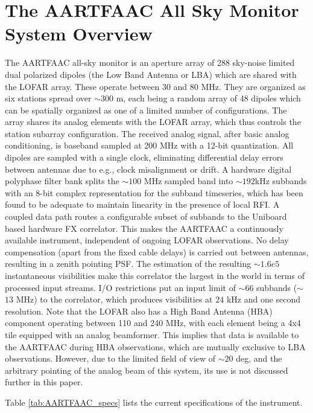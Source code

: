 \documentclass{aa}
\begin{document}
\section{\label{sec:The-AARTFAAC-All}The AARTFAAC All Sky Monitor System
Overview} The  AARTFAAC all-sky  monitor is an  aperture array of  288 sky-noise
limited dual  polarized dipoles (the Low  Band Antenna or LBA)  which are shared
with the LOFAR  array. These operate between 30 and 80  MHz.  They are organized
as  six stations spread  over $\sim$$300$  m, each  being a  random array  of 48
dipoles  which  can  be spatially  organized  as  one  of  a limited  number  of
configurations. The array shares its analog elements with the LOFAR array, which
thus controls  the station subarray  configuration. The received  analog signal,
after basic  analog conditioning, is baseband  sampled at 200 MHz  with a 12-bit
quantization.   All  dipoles  are  sampled  with  a  single  clock,  eliminating
differential delay  errors between antennas  due to e.g., clock  misalignment or
drift.   A hardware  digital polyphase  filter bank  splits the  $\sim$$100$ MHz
sampled band  into $\sim$$192$kHz subbands with an  8-bit complex representation
for the  subband timeseries,  which has  been found to  be adequate  to maintain
linearity  in  the  presence  of  local  RFI.  A  coupled  data  path  routes  a
configurable   subset  of   subbands   to  the   Uniboard   based  hardware   FX
correlator.  This  makes  the  AARTFAAC  a  continuously  available  instrument,
independent of ongoing LOFAR observations. No delay compensation (apart from the
fixed  cable delays)  is carried  out between  antennas, resulting  in  a zenith
pointing  PSF. The  estimation  of  the  resulting  $\sim$$1.6e5$  instantaneous
visibilities make this correlator the largest in the world in terms of processed
input  streams. I/O  restrictions  put  an input  limit  of $\sim$$66$  subbands
($\sim$$13$ MHz) to the correlator,  which produces visibilities at $24$ kHz and
one second  resolution. Note that the LOFAR  also has a High  Band Antenna (HBA)
component operating between 110 and 240  MHz, with each element being a 4x4 tile
equipped with an  analog beamformer. This implies that data  is available to the
AARTFAAC  during   HBA  observations,  which  are  mutually   exclusive  to  LBA
observations.  However, due to the limited  field of view of $\sim$$20$ deg, and
the  arbitrary pointing  of  the analog  beam of  this  system, its  use is  not
discussed further in this paper.

Table \ref{tab:AARTFAAC_specs} lists the current specifications of
the instrument. 
\end{document}
